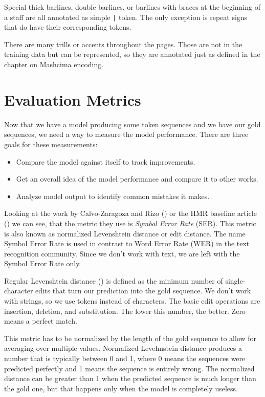 Special thick barlines, double barlines, or barlines with braces at the beginning of a staff are all annotated as simple \verb`|` token. The only exception is repeat signs that do have their corresponding tokens.

There are many trills or accents throughout the pages. Those are not in the training data but can be represented, so they are annotated just as defined in the chapter on Mashcima encoding.


\section{Evaluation Metrics}

Now that we have a model producing some token sequences and we have our gold sequences, we need a way to measure the model performance. There are three goals for these measurements:

\begin{itemize}
\item Compare the model against itself to track improvements.
\item Get an overall idea of the model performance and compare it to other works.
\item Analyze model output to identify common mistakes it makes.
\end{itemize}

Looking at the work by Calvo-Zaragoza and Rizo (\cite{Primus}) or the HMR baseline article (\cite{HmrBaseline}) we can see, that the metric they use is \emph{Symbol Error Rate} (SER). This metric is also known as normalized Levenshtein distance or edit distance. The name Symbol Error Rate is used in contrast to Word Error Rate (WER) in the text recognition community. Since we don't work with text, we are left with the Symbol Error Rate only.

Regular Levenshtein distance (\cite{Levenshtein}) is defined as the minimum number of single-character edits that turn our prediction into the gold sequence. We don't work with strings, so we use tokens instead of characters. The basic edit operations are insertion, deletion, and substitution. The lower this number, the better. Zero means a perfect match.

This metric has to be normalized by the length of the gold sequence to allow for averaging over multiple values. Normalized Levehnstein distance produces a number that is typically between 0 and 1, where 0 means the sequences were predicted perfectly and 1 means the sequence is entirely wrong. The normalized distance can be greater than 1 when the predicted sequence is much longer than the gold one, but that happens only when the model is completely useless.

